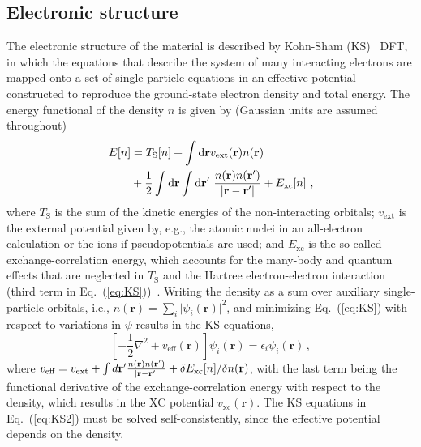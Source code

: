 \documentclass[
    prd, twocolumn, superscriptaddress, nofootinbib, amsmath, amssymb,
    aps, floatfix,preprintnumbers
]{revtex4-2}
\begin{document}
    \subsection{Electronic structure}\label{subsec:2.1}
        The electronic structure of the material is described by Kohn-Sham (KS)~\cite{KohnSham65} DFT, in which the equations that describe the system of many interacting electrons are mapped onto a set of single-particle equations in an effective potential constructed to reproduce the ground-state electron density and total energy. The energy functional of the density $n$ is given by (Gaussian units are assumed throughout) 
        \begin{equation}
            \begin{split}
                E[n] &= T_{\text{S}}[n] + \int\mathrm{d}\mathbf{r} v_{\text{ext}}(\textbf{r})n(\textbf{r}) \\ &+ 
                \frac{1}{2}\int\mathrm{d}\mathbf{r}\int\mathrm{d}\mathbf{r}^\prime\ \frac{n(\mathbf{r})n(\mathbf{r}^\prime)}{\abs{\mathbf{r - r}^\prime}} + E_{\text{xc}}[n] \ ,
                \label{eq:KS}
            \end{split}
        \end{equation}
        where $T_{\text{S}}$ is the sum of the kinetic energies of the non-interacting orbitals; $v_{\text{ext}}$ is the external potential given by, e.g., the atomic nuclei in an all-electron calculation or the ions if pseudopotentials are used; and $E_{\text{xc}}$ is the so-called exchange-correlation energy, which accounts for the many-body and quantum effects that are neglected in  $T_{\text{S}}$ and the Hartree electron-electron interaction (third term in Eq.~(\ref{eq:KS}))~\cite{Martin2020}. Writing the density as a sum over auxiliary single-particle orbitals, i.e., $n(\textbf{r})=\sum_i\vert\psi_i(\textbf{r})\vert^2$, and minimizing Eq.~(\ref{eq:KS}) with respect to variations in $\psi$ results in the KS equations, 
        \begin{equation}
            \left[-\frac12 \nabla^2+v_{\text{eff}}(\textbf{r})\right]\psi_i(\textbf{r})=\epsilon_i\psi_i(\textbf{r})\,,
            \label{eq:KS2}
        \end{equation}
        where $v_{\text{eff}}=v_{\text{ext}}+\int d\mathbf{r}^\prime \frac{n(\mathbf{r})n(\mathbf{r}^\prime)}{\abs{\mathbf{r -r}^\prime}}+\delta E_{\text{xc}}[n]/\delta n(\textbf{r})$, with the last term being the functional derivative of the exchange-correlation energy with respect to the density, which results in the XC potential $v_{\text{xc}}(\textbf{r})$. The KS equations in Eq.~(\ref{eq:KS2}) must be solved self-consistently, since the effective potential depends on the density.
        
\end{document}
